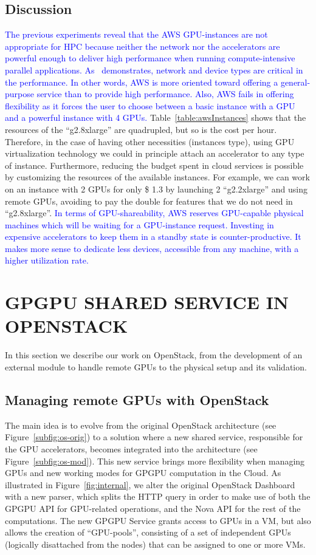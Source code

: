 \documentclass[a4paper,twoside]{article}
\begin{document}
\subsection{Discussion}
\textcolor{blue}{The previous experiments reveal that the AWS GPU-instances are not appropriate for HPC
because neither the network nor the accelerators are powerful enough to deliver high performance
when running compute-intensive parallel applications. As~\cite{tonithesis} demonstrates, network and device types are critical in the performance.
In other words, AWS is more oriented toward offering a general-purpose service than to provide high performance.
Also, AWS fails in offering flexibility as it forces the user to choose between a basic instance with a GPU and a powerful instance with 4 GPUs.
}
Table~\ref{table:awsInstances} shows that the resources of the ``g2.8xlarge'' are quadrupled, but so is the cost per hour.
Therefore, in the case of having other necessities (instances type), using GPU virtualization technology we could in principle attach an accelerator to any type of instance.
Furthermore, reducing the budget spent in cloud services is possible by customizing the resources of the available instances.
For example, we can work on an instance with 2 GPUs for only \$ 1.3 by launching 2 ``g2.2xlarge'' and using remote GPUs, avoiding to pay the double for features that we do not need in ``g2.8xlarge''.
\textcolor{blue}{
In terms of GPU-shareability, AWS reserves GPU-capable physical machines which will be waiting for a GPU-instance request.
Investing in expensive accelerators to keep them in a standby state is counter-productive. 
It makes more sense to dedicate less devices, accessible from any machine, with a higher utilization rate.
}
\section{\uppercase{GPGPU Shared Service in OpenStack}}
\label{sec:gpgpuOS}
In this section we describe our work on OpenStack, from the development of an external module to handle remote GPUs to the physical setup and its validation.

\subsection{Managing remote GPUs with OpenStack}
The main idea is to evolve from the original OpenStack architecture (see Figure~\ref{subfig:os-orig})
 to a solution where a new shared service, responsible for the GPU accelerators, becomes integrated into the architecture (see Figure~\ref{subfig:os-mod}).
This new service brings more flexibility when managing GPUs and new working modes for GPGPU computation in the Cloud.
As illustrated in Figure~\ref{fig:internal}, we alter the original OpenStack Dashboard with a new parser, 
which splits the HTTP query in order to make use of both the GPGPU API for GPU-related operations, and the Nova API for the rest of the computations. 
The new GPGPU Service grants access to GPUs in a VM, but also allows the creation of ``GPU-pools'', consisting of a set of independent GPUs (logically disattached from the nodes) that can be assigned to one or more VMs.
\end{document}
